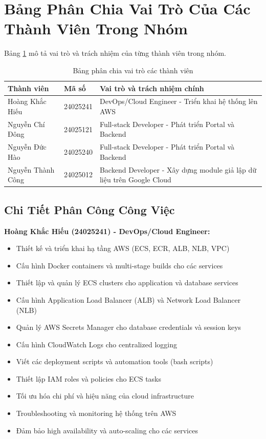 \section{Bảng Phân Chia Vai Trò Của Các Thành Viên Trong Nhóm}

Bảng \ref{tab:vai-tro} mô tả vai trò và trách nhiệm của từng thành viên trong nhóm.

\begin{table}[H]
\centering
\caption{Bảng phân chia vai trò các thành viên}
\label{tab:vai-tro}
\begin{tabular}{|p{3.5cm}|p{2.5cm}|p{7cm}|}
\hline
\textbf{Thành viên} & \textbf{Mã số} & \textbf{Vai trò và trách nhiệm chính} \\
\hline
Hoàng Khắc Hiếu & 24025241 & DevOps/Cloud Engineer - Triển khai hệ thống lên AWS \\
\hline
Nguyễn Chí Đông & 24025121 & Full-stack Developer - Phát triển Portal và Backend \\
\hline
Nguyễn Đức Hào & 24025240 & Full-stack Developer - Phát triển Portal và Backend \\
\hline
Nguyễn Thành Công & 24025012 & Backend Developer - Xây dựng module giả lập dữ liệu trên Google Cloud \\
\hline
\end{tabular}
\end{table}

\subsection{Chi Tiết Phân Công Công Việc}

\textbf{Hoàng Khắc Hiếu (24025241) - DevOps/Cloud Engineer:}
\begin{itemize}
    \item Thiết kế và triển khai hạ tầng AWS (ECS, ECR, ALB, NLB, VPC)
    \item Cấu hình Docker containers và multi-stage builds cho các services
    \item Thiết lập và quản lý ECS clusters cho application và database services
    \item Cấu hình Application Load Balancer (ALB) và Network Load Balancer (NLB)
    \item Quản lý AWS Secrets Manager cho database credentials và session keys
    \item Cấu hình CloudWatch Logs cho centralized logging
    \item Viết các deployment scripts và automation tools (bash scripts)
    \item Thiết lập IAM roles và policies cho ECS tasks
    \item Tối ưu hóa chi phí và hiệu năng của cloud infrastructure
    \item Troubleshooting và monitoring hệ thống trên AWS
    \item Đảm bảo high availability và auto-scaling cho các services
\end{itemize}

